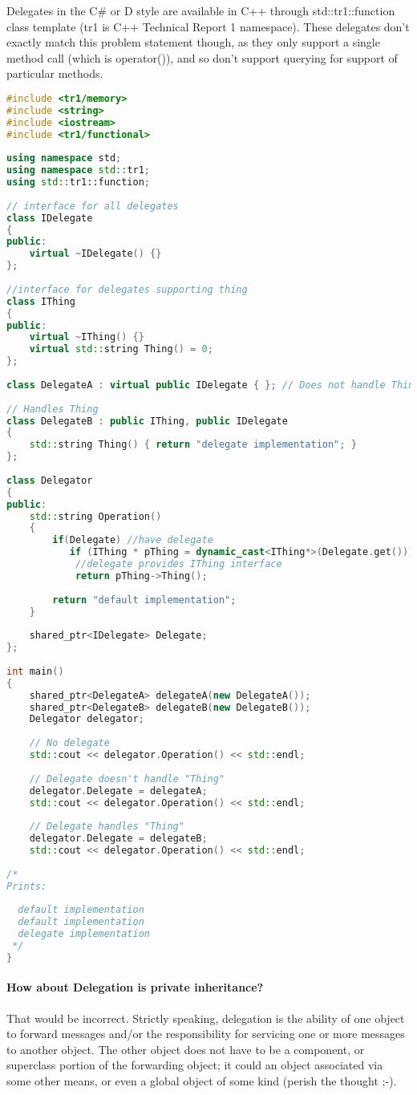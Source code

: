 \documentclass{book}
\begin{document}
Delegates in the C\# or D style are available in C++ through std::tr1::function class template (tr1 is C++ Technical Report 1 namespace).
These delegates don't exactly match this problem statement though, 
as they only support a single method call (which is operator()), and so don't support querying for support of particular methods. 
\begin{lstlisting}[caption={Delegation example code C++ tr1 implementation}, language=C++]
#include <tr1/memory>
#include <string>
#include <iostream>
#include <tr1/functional>
 
using namespace std;
using namespace std::tr1;
using std::tr1::function;
 
// interface for all delegates
class IDelegate
{
public:
    virtual ~IDelegate() {}
};
 
//interface for delegates supporting thing 
class IThing
{
public:
    virtual ~IThing() {}
    virtual std::string Thing() = 0;
};
 
class DelegateA : virtual public IDelegate { }; // Does not handle Thing
 
// Handles Thing
class DelegateB : public IThing, public IDelegate
{
    std::string Thing() { return "delegate implementation"; }
};
 
class Delegator
{
public:
    std::string Operation()
    {
        if(Delegate) //have delegate
           if (IThing * pThing = dynamic_cast<IThing*>(Delegate.get()))
            //delegate provides IThing interface
            return pThing->Thing();
 
        return "default implementation";
    }
 
    shared_ptr<IDelegate> Delegate;
};
 
int main()
{
    shared_ptr<DelegateA> delegateA(new DelegateA());
    shared_ptr<DelegateB> delegateB(new DelegateB());
    Delegator delegator;
 
    // No delegate
    std::cout << delegator.Operation() << std::endl;
 
    // Delegate doesn't handle "Thing"
    delegator.Delegate = delegateA;
    std::cout << delegator.Operation() << std::endl;
 
    // Delegate handles "Thing"
    delegator.Delegate = delegateB;
    std::cout << delegator.Operation() << std::endl;
 
/*
Prints:
 
  default implementation
  default implementation
  delegate implementation
 */
}
\end{lstlisting}
\paragraph{How about Delegation is private inheritance?}
That would be incorrect. Strictly speaking, delegation is the ability of one object to forward messages and/or the responsibility for
servicing one or more messages to another object. The other object does not have to be a component, or superclass portion of the
forwarding object; it could an object associated via some other means, or even a global object of some kind (perish the thought ;-).
\end{document}

